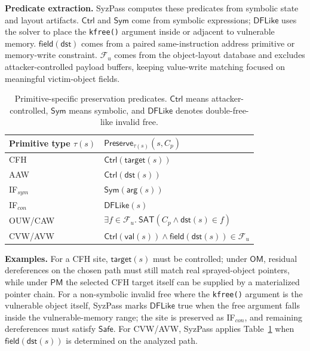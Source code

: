 \noindent\textbf{Predicate extraction.}
SyzPass computes these predicates from symbolic state and layout artifacts. $\mathsf{Ctrl}$ and $\mathsf{Sym}$ come from symbolic expressions; $\mathsf{DFLike}$ uses the solver to place the \texttt{kfree()} argument inside or adjacent to vulnerable memory. $\mathsf{field}(\mathsf{dst})$ comes from a paired same-instruction address primitive or memory-write constraint. $\mathcal{F}_{u}$ comes from the object-layout database and excludes attacker-controlled payload buffers, keeping value-write matching focused on meaningful victim-object fields.

\begin{table}[t]
  \centering
  \small
  \setlength{\tabcolsep}{6pt}
  \renewcommand{\arraystretch}{1.08}
  \begin{tabular}{@{}ll@{}}
    \toprule
    \textbf{Primitive type $\tau(s)$} & \textbf{$\mathsf{Preserve}_{\tau(s)}(s,C_p)$} \\
    \midrule
    CFH & $\mathsf{Ctrl}(\mathsf{target}(s))$ \\
    AAW & $\mathsf{Ctrl}(\mathsf{dst}(s))$ \\
    IF$_{sym}$ & $\mathsf{Sym}(\mathsf{arg}(s))$ \\
    IF$_{con}$ & $\mathsf{DFLike}(s)$ \\
    OUW/CAW & $\exists f \in \mathcal{F}_{u}.\ \mathsf{SAT}(C_p \land \mathsf{dst}(s) \in f)$ \\
    CVW/AVW & $\mathsf{Ctrl}(\mathsf{val}(s)) \land \mathsf{field}(\mathsf{dst}(s)) \in \mathcal{F}_{u}$ \\
    \bottomrule
  \end{tabular}
  \caption{Primitive-specific preservation predicates. $\mathsf{Ctrl}$ means attacker-controlled, $\mathsf{Sym}$ means symbolic, and $\mathsf{DFLike}$ denotes double-free-like invalid free.}
  \label{tab:primitive-aware-rules}
\end{table}

\noindent\textbf{Examples.} For a CFH site, $\mathsf{target}(s)$ must be controlled; under $\mathsf{OM}$, residual dereferences on the chosen path must still match real sprayed-object pointers, while under $\mathsf{PM}$ the selected CFH target itself can be supplied by a materialized pointer chain. For a non-symbolic invalid free where the \texttt{kfree()} argument is the vulnerable object itself, SyzPass marks $\mathsf{DFLike}$ true when the free argument falls inside the vulnerable-memory range; the site is preserved as IF$_{con}$, and remaining dereferences must satisfy $\mathsf{Safe}$. For CVW/AVW, SyzPass applies Table~\ref{tab:primitive-aware-rules} when $\mathsf{field}(\mathsf{dst}(s))$ is determined on the analyzed path.

